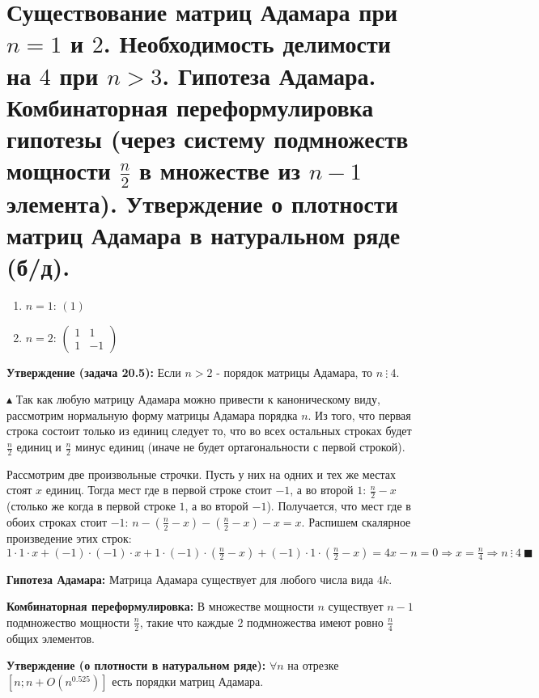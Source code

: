 \setcounter{section}{15}
\section{Существование матриц Адамара при $n = 1$ и $2$. Необходимость делимости на $4$ при $n > 3$. Гипотеза Адамара. Комбинаторная переформулировка гипотезы (через систему подмножеств мощности $\frac{n}{2}$ в множестве из $n - 1$ элемента). Утверждение о плотности матриц Адамара в натуральном ряде (б/д).}
\begin{enumerate}
    \item $n=1$: $(1)$
    \item $n=2$: $\left(
\begin{array}{cc}
1 & 1\\
1 & -1
\end{array}
\right)$
\end{enumerate}
\par \textbf{Утверждение (задача 20.5):} Если $n>2$ - порядок матрицы Адамара, то $n\: \vdots \:4$.
\par $\blacktriangle$ Так как любую матрицу Адамара можно привести к каноническому виду, рассмотрим нормальную форму матрицы Адамара порядка $n$. Из того, что первая строка состоит только из единиц следует то, что во всех остальных строках будет $\frac{n}{2}$ единиц и $\frac{n}{2}$ минус единиц (иначе не будет ортагональности с первой строкой).
\par Рассмотрим две произвольные строчки. Пусть у них на одних и тех же местах стоят $x$ единиц. Тогда мест где в первой строке стоит $-1$, а во второй $1$: $\frac{n}{2}-x$ (столько же когда в первой строке $1$, а во второй $-1$). Получается, что мест где в обоих строках стоит $-1$: $n-(\frac{n}{2}-x)-(\frac{n}{2}-x)-x=x$. Распишем скалярное произведение этих строк: $1 \cdot 1 \cdot x + (-1) \cdot (-1) \cdot x + 1 \cdot (-1) \cdot (\frac{n}{2}-x) + (-1) \cdot 1 \cdot (\frac{n}{2}-x)=4x-n=0 \Rightarrow x = \frac{n}{4} \Rightarrow n\: \vdots \: 4 \: \blacksquare$
\par \textbf{Гипотеза Адамара:} Матрица Адамара существует для любого числа вида $4k$.
\par \textbf{Комбинаторная переформулировка:} В множестве мощности $n$ существует $n-1$ подмножество мощности $\frac{n}{2}$, такие что каждые $2$ подмножества имеют ровно $\frac{n}{4}$ общих элементов.
\par \textbf{Утверждение (о плотности в натуральном ряде):} $\forall n$ на отрезке  $[n;n+O(n^{0.525})]$ есть порядки матриц Адамара. 